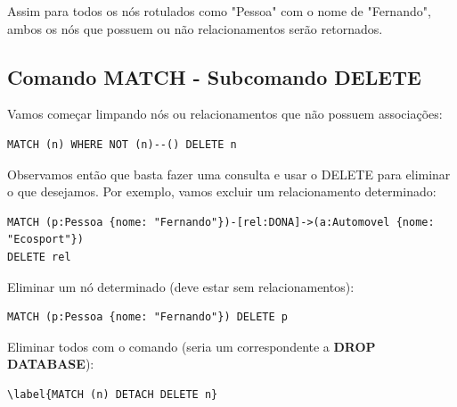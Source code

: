 Assim para todos os nós rotulados como "Pessoa" com o nome de "Fernando", ambos os nós que possuem ou não relacionamentos serão retornados.

\subsection{Comando MATCH - Subcomando DELETE}
Vamos começar limpando nós ou relacionamentos que não possuem associações:
\begin{lstlisting}[]
MATCH (n) WHERE NOT (n)--() DELETE n
\end{lstlisting}

Observamos então que basta fazer uma consulta e usar o DELETE para eliminar o que desejamos. Por exemplo, vamos excluir um relacionamento determinado:
\begin{lstlisting}[]
MATCH (p:Pessoa {nome: "Fernando"})-[rel:DONA]->(a:Automovel {nome: "Ecosport"})
DELETE rel
\end{lstlisting}

Eliminar um nó determinado (deve estar sem relacionamentos):
\begin{lstlisting}[]
MATCH (p:Pessoa {nome: "Fernando"}) DELETE p
\end{lstlisting}

Eliminar todos com o comando (seria um correspondente a \textbf{DROP DATABASE}):
\begin{lstlisting}[]
\label{MATCH (n) DETACH DELETE n}
\end{lstlisting}

